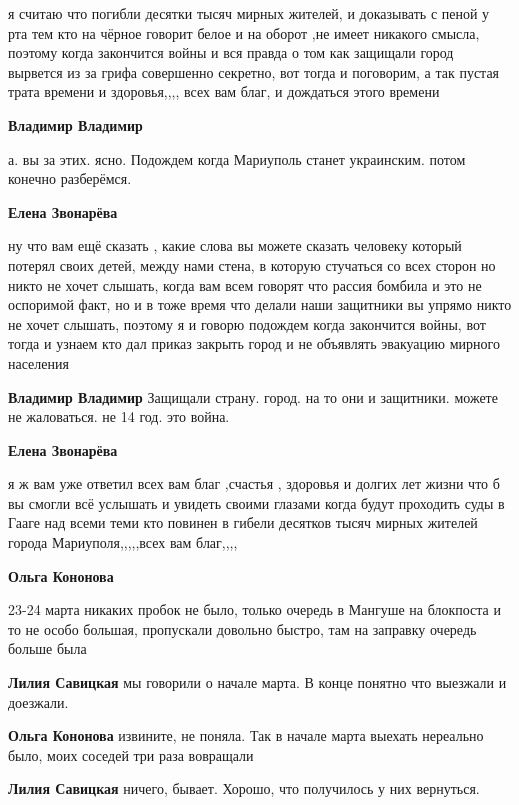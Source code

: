 \begin{itemize}
я считаю что погибли десятки тысяч мирных жителей, и доказывать с пеной у рта
тем кто на чёрное говорит белое и на оборот ,не имеет никакого смысла, поэтому
когда закончится войны и вся правда о том как защищали город вырвется из за
грифа совершенно секретно, вот тогда и поговорим, а так пустая трата времени и
здоровья,,,, всех вам благ, и дождаться этого времени

\textbf{Владимир Владимир} 

а. вы за этих. ясно. Подождем когда Мариуполь станет украинским. потом конечно разберёмся.

\textbf{Елена Звонарёва} 

ну что вам ещё сказать , какие слова вы можете сказать человеку который потерял
своих детей, между нами стена, в которую стучаться со всех сторон но никто не
хочет слышать, когда вам всем говорят что рассия бомбила и это не оспоримой
факт, но и в тоже время что делали наши защитники вы упрямо никто не хочет
слышать, поэтому я и говорю подождем когда закончится войны, вот тогда и узнаем
кто дал приказ закрыть город и не объявлять эвакуацию мирного населения

\textbf{Владимир Владимир} Защищали страну. город. на то они и защитники. можете не жаловаться. не 14 год. это война.

\textbf{Елена Звонарёва} 

я ж вам уже ответил всех вам благ ,счастья , здоровья и долгих лет жизни что б
вы смогли всё услышать и увидеть своими глазами когда будут проходить суды в
Гааге над всеми теми кто повинен в гибели десятков тысяч мирных жителей города
Мариуполя,,,,,всех вам благ,,,,

\textbf{Ольга Кононова} 

23-24 марта никаких пробок не было, только очередь в Мангуше на блокпоста и то
не особо большая, пропускали довольно быстро, там на заправку очередь больше
была

\textbf{Лилия Савицкая} мы говорили о начале марта. В конце понятно что выезжали и доезжали.

\textbf{Ольга Кононова} извините, не поняла. Так в начале марта выехать нереально было, моих соседей три раза вовращали

\textbf{Лилия Савицкая} ничего, бывает. Хорошо, что получилось у них вернуться.


\end{itemize} %

